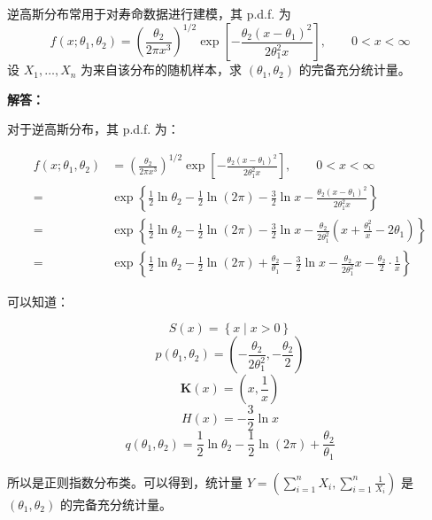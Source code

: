 \documentclass[12pt,a4paper]{article}
\begin{document}
逆高斯分布常用于对寿命数据进行建模，其 p.d.f. 为
\[
    f(x;\theta_1,\theta_2)=\left(\frac{\theta_2}{2\pi x^3}\right)^{1/2}
    \exp\left[-\frac{\theta_2(x-\theta_1)^2}{2\theta_1^2 x}\right],
    \qquad 0<x<\infty
\]
设 $X_1,\ldots,X_n$ 为来自该分布的随机样本，求 $(\theta_1,\theta_2)$ 的完备充分统计量。

\begin{answerbox}
\textbf{解答：}

对于逆高斯分布，其 p.d.f. 为：

\[
\begin{aligned}
f(x;\theta_1,\theta_2)&=\left(\frac{\theta_2}{2\pi x^3}\right)^{1/2}
    \exp\left[-\frac{\theta_2(x-\theta_1)^2}{2\theta_1^2 x}\right],
    \qquad 0<x<\infty \\
=& \exp\left\{\frac{1}{2}\ln \theta_2 - \frac{1}{2}\ln (2\pi) - \frac{3}{2} \ln x - \frac{\theta_2(x-\theta_1)^2}{2\theta_1^2 x}\right\} \\
=& \exp\left\{\frac{1}{2}\ln \theta_2 - \frac{1}{2}\ln (2\pi) - \frac{3}{2} \ln x - \frac{\theta_2}{2\theta_1^2}\left(x + \frac{\theta_1^2}{x} - 2\theta_1\right)\right\} \\
=& \exp\left\{\frac{1}{2}\ln \theta_2 - \frac{1}{2}\ln (2\pi) + \frac{\theta_2}{\theta_1} - \frac{3}{2} \ln x - \frac{\theta_2}{2\theta_1^2}x - \frac{\theta_2}{2}\cdot \frac{1}{x} \right\}
\end{aligned}
\]

可以知道：

$$
S(x) = \left\{x \mid x > 0\right\}
$$
$$
p(\theta_1, \theta_2) = \left(- \frac{\theta_2}{2\theta_1^2}, - \frac{\theta_2}{2}\right)
$$
$$
\mathbf{K}(x) = \left(x,  \frac{1}{x}\right)
$$
$$
H(x) = - \frac{3}{2} \ln x 
$$
$$
q(\theta_1, \theta_2) = \frac{1}{2}\ln \theta_2 - \frac{1}{2}\ln (2\pi) + \frac{\theta_2}{\theta_1}
$$

所以是正则指数分布类。可以得到，统计量 $Y = \left(\sum_{i=1}^{n} X_i, \sum_{i=1}^{n} \frac{1}{X_i}\right)$ 是 $(\theta_1, \theta_2)$ 的完备充分统计量。

\end{answerbox}
\end{document}
